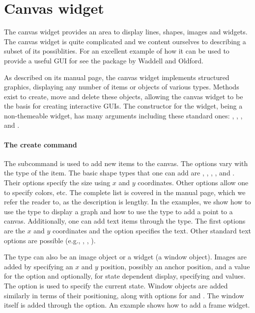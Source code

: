 \section{Canvas widget}
\label{sec:tcltk:canvas-widget}

 
The canvas widget provides an area to display lines, shapes, images
and widgets. The canvas widget is quite complicated and we content
ourselves to describing a subset of its possiblities. For an excellent
example of how it can be used to provide a useful GUI for \R{} see the
 package by Waddell and Oldford.


As described on its manual page, the canvas widget implements
structured graphics, displaying any number of items or objects of
various types.  Methods exist to create, move and delete these
objects, allowing the canvas widget to be the basis for creating
interactive GUIs. The constructor  for the
widget, being a non-themeable widget, has many arguments including
these standard ones: ,
, ,
 and
.


\paragraph{The create command}
The subcommand  is used
to add new items to the canvas. The options vary with the type of the
item. The basic shape types that one can add are ,
, , , and
. Their options specify the size using $x$ and $y$
coordinates. Other options allow one to specify colors, etc. The
complete list is covered in the  manual page, which we
refer the reader to, as the description is lengthy.  In the examples,
we show how to use the  type to display a graph and how to
use the  type to add a point to a canvas. Additionally,
one can add text items through the  type. The first
options are the $x$ and $y$ coordinates and the  option
specifies the text.  Other standard text options are possible (e.g.,
, , ).

The type can also be an image object or a widget (a window
object). Images are added by specifying an $x$ and $y$ position,
possibly an anchor position, and a value for the  option
and optionally, for state dependent display, specifying
 and  values. The
 option is used to specify the current state. Window
objects are added similarly in terms of their positioning, along with
options for  and . The window itself is
added through the  option. An example shows how to add a
frame widget.

